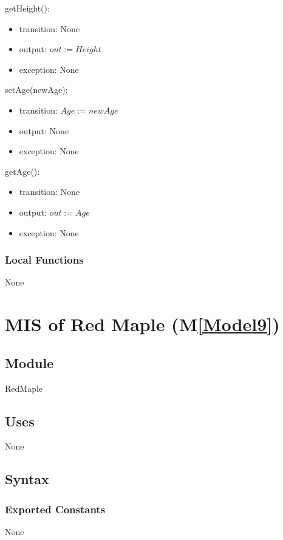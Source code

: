 \documentclass[12pt, titlepage]{article}
\newcommand{\mref}[1]{M\ref{#1}}
\begin{document}
\noindent getHeight():
\begin{itemize}
\item transition: None
\item output: $\mathit{out := Height}$
\item exception: None
\end{itemize}
\noindent setAge(newAge):
\begin{itemize}
\item transition: $\mathit{Age := newAge}$
\item output: None
\item exception: None
\end{itemize}
\noindent getAge():
\begin{itemize}
\item transition: None
\item output: $\mathit{out := Age}$
\item exception: None
\end{itemize}

\subsubsection{Local Functions}
None

 \newpage

\renewcommand{\tn}{Red Maple }
\renewcommand{\tmn}{RedMaple}
\renewcommand{\constn}{Red\ Maple}

\section{MIS of \tn (\mref{Model9})}

\subsection{Module}
\tmn

\subsection{Uses}
None

\subsection{Syntax}
\subsubsection{Exported Constants}
None
\end{document}
